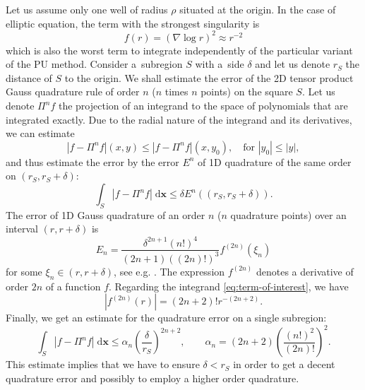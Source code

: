 \documentclass{elsarticle}
\def\vc#1{\mathbf{\boldsymbol{#1}}}     %
\def\abs#1{\left|#1\right|}
\def\d{\mathrm{d}}
\def\abs#1{| #1 |}
\newcommand{\dd}{\; \mathrm{d}}
\newcommand{\bx}{\vc{x}}
\newcommand{\noteJB}[1]{{\color{Blue} \textbf{JB: } \textit{#1}}}
\begin{document}
Let us assume only one well of radius $\rho$ situated at the origin. In the case of elliptic equation, the term with the strongest singularity is 
\begin{equation}
    \label{eq:term-of-interest}
    f(r)=(\nabla \log r )^2 \approx r^{-2}
\end{equation}
which is also the worst term to integrate independently of the particular variant of the PU method.
Consider a~subregion $S$ with a~side $\delta$ and 
let us denote $r_{S}$ the distance of $S$ to the origin.
We shall estimate the error of the 2D tensor product Gauss quadrature rule of order $n$ ($n$ times $n$ points) on the square $S$. Let us denote 
$\Pi^n f$ the projection of an integrand to the space of polynomials that are integrated exactly. Due to the radial nature of the integrand and its derivatives,
we can estimate
\[
  \abs{f-\Pi^n f}(x,y) \le \abs{f-\Pi^n f}(x,y_0), \quad \text{for } \abs{y_0} \le \abs{y},
\]
and thus estimate the error by the error $E^n$ of 
 1D quadrature of the same order on $(r_{S}, r_{S}+\delta)$:
\[
  \int_S \abs{f-\Pi^n f} \dd\bx \le \delta E^n((r_{S}, r_{S}+\delta)).
\]
The error of 1D Gauss quadrature of an order $n$ ($n$ quadrature points) over an interval $(r,r+\delta)$ is 
\[
  E_n = \frac{\delta^{2n+1} (n!)^4}{(2n+1)((2n)!)^3} f^{(2n)}(\xi_n) 
\]
for some $\xi_n \in (r, r+\delta)$, see e.g. \cite{kahaner_numerical_1989}. 
The expression $f^{(2n)}$ denotes a derivative of order $2n$ of a function $f$.
Regarding the integrand \eqref{eq:term-of-interest}, we have 
\[
  \abs{f^{(2n)}(r)} = (2n+2)! r^{-(2n+2)}.
\]
Finally, we get an estimate for the quadrature error on a single subregion:
\[
    \int_S \abs{f-\Pi^n f}  \dd\bx \le  \alpha_n \left( \frac{\delta}{r_{S}} \right)^{2n+2}, 
  \qquad \alpha_n = (2n+2)\left( \frac{(n!)^2}{(2n)!} \right)^2.
\]
This estimate implies that we have to ensure $\delta < r_S$ in order to get a decent quadrature error 
and possibly to employ a higher order quadrature. 


\end{document}
